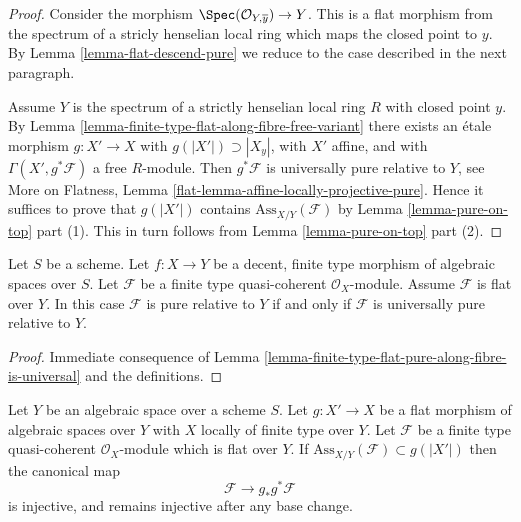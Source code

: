 \begin{proof}
Consider the morphism $\Spec(\mathcal{O}_{Y, \overline{y}}) \to Y$.
This is a flat morphism from the spectrum of a stricly henselian
local ring which maps the closed point to $y$.
By Lemma \ref{lemma-flat-descend-pure} we reduce to the case
described in the next paragraph.

\medskip\noindent
Assume $Y$ is the spectrum of a strictly henselian local ring $R$
with closed point $y$.
By Lemma \ref{lemma-finite-type-flat-along-fibre-free-variant}
there exists an \'etale morphism $g : X' \to X$ with
$g(|X'|) \supset |X_y|$, with $X'$ affine, and with
$\Gamma(X', g^*\mathcal{F})$ a free $R$-module.
Then $g^*\mathcal{F}$ is universally pure relative to $Y$, see
More on Flatness, Lemma \ref{flat-lemma-affine-locally-projective-pure}.
Hence it suffices to prove that
$g(|X'|)$ contains $\text{Ass}_{X/Y}(\mathcal{F})$
by Lemma \ref{lemma-pure-on-top} part (1).
This in turn follows from
Lemma \ref{lemma-pure-on-top} part (2).
\end{proof}

\begin{lemma}
\label{lemma-finite-type-flat-pure-is-universal}
Let $S$ be a scheme.
Let $f : X \to Y$ be a decent, finite type morphism of algebraic
spaces over $S$.
Let $\mathcal{F}$ be a finite type quasi-coherent $\mathcal{O}_X$-module.
Assume $\mathcal{F}$ is flat over $Y$. In this case
$\mathcal{F}$ is pure relative to $Y$ if and only if $\mathcal{F}$
is universally pure relative to $Y$.
\end{lemma}

\begin{proof}
Immediate consequence of
Lemma \ref{lemma-finite-type-flat-pure-along-fibre-is-universal}
and the definitions.
\end{proof}

\begin{lemma}
\label{lemma-universally-separating}
Let $Y$ be an algebraic space over a scheme $S$.
Let $g : X' \to X$ be a flat morphism of algebraic spaces over $Y$
with $X$ locally of finite type over $Y$.
Let $\mathcal{F}$ be a finite type quasi-coherent $\mathcal{O}_X$-module
which is flat over $Y$. If $\text{Ass}_{X/Y}(\mathcal{F}) \subset g(|X'|)$
then the canonical map
$$
\mathcal{F} \longrightarrow g_*g^*\mathcal{F}
$$
is injective, and remains injective after any base change.
\end{lemma}

